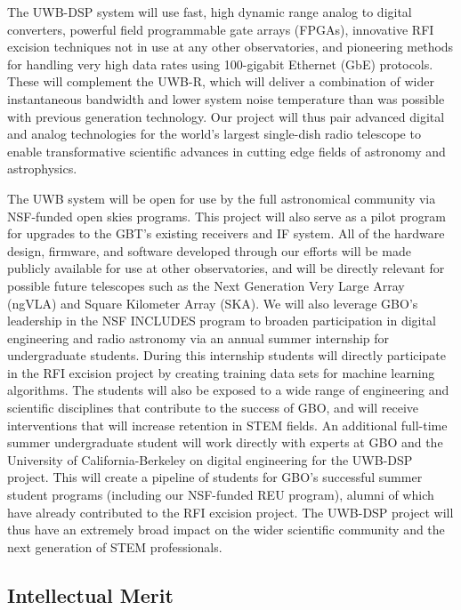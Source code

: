 \documentclass[10pt]{myNSF}
\begin{document}
The UWB-DSP system will use fast, high dynamic range analog to
digital converters, powerful field programmable gate arrays
(FPGAs), innovative RFI excision techniques not in use at any
other observatories, and pioneering methods for handling very high
data rates using 100-gigabit Ethernet (GbE) protocols.  These will
complement the UWB-R, which will deliver a combination of wider
instantaneous bandwidth and lower system noise temperature than was
possible with previous generation technology.  Our project will thus
pair advanced digital and analog technologies for the world's largest
single-dish radio telescope to enable transformative scientific
advances in cutting edge fields of astronomy and astrophysics.

The UWB system will be open for use by the full astronomical community
via NSF-funded open skies programs.  This project will also serve as a
pilot program for upgrades to the GBT's existing receivers and IF
system.  All of the hardware design, firmware, and software developed
through our efforts will be made publicly available for use at other
observatories, and will be directly relevant for possible future
telescopes such as the Next Generation Very Large Array (ngVLA) and
Square Kilometer Array (SKA).  We will also leverage GBO's leadership
in the NSF INCLUDES program to broaden participation in digital
engineering and radio astronomy via an annual summer internship for
undergraduate students.  During this internship students will directly
participate in the RFI excision project by creating training data sets
for machine learning algorithms.  The students will also be exposed to
a wide range of engineering and scientific disciplines that contribute
to the success of GBO, and will receive interventions that will
increase retention in STEM fields.  An additional full-time summer
undergraduate student will work directly with experts at GBO and the
University of California-Berkeley on digital engineering for the
UWB-DSP project.  This will create a pipeline of students for GBO's
successful summer student programs (including our NSF-funded REU
program), alumni of which have already contributed to the RFI excision
project.  The UWB-DSP project will thus have an extremely broad impact
on the wider scientific community and the next generation of STEM
professionals.

\subsection{Intellectual Merit}
\label{sec:IM}
\end{document}
